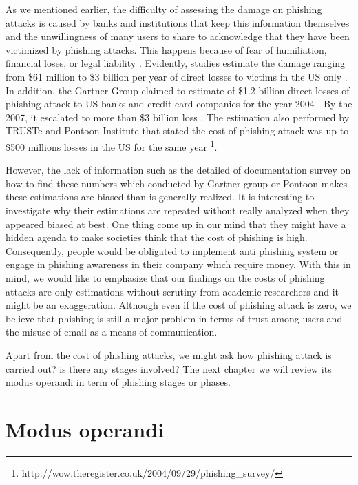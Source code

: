 As we mentioned earlier, the difficulty of assessing the damage on
phishing attacks is caused by banks and institutions that keep this
information themselves and the unwillingness of many users to share
to acknowledge that they have been victimized by phishing attacks.
This happens because of fear of humiliation, financial loses, or legal
liability \citep{jakobsson:2006}. Evidently, studies estimate the
damage ranging from \$61 million \citep{herley:2009} to \$3 billion
per year \citep{mccall2007gartner} of direct losses to victims in
the US only \citep{hong:2012}\citep{moura2009scalable}. In addition,
the Gartner Group claimed to estimate of \$1.2 billion direct losses
of phishing attack to US banks and credit card companies for the year
2004 \citep{litan2004phishing}. By the 2007, it escalated to more
than \$3 billion loss \citep{mccall:2007}. The estimation also performed
by TRUSTe and Pontoon Institute that stated the cost of phishing attack
was up to \$500 millions losses in the US for the same year %
\footnote{http://wow.theregister.co.uk/2004/09/29/phishing\_survey/%
}.

However, the lack of information such as the detailed of documentation
survey on how to find these numbers which conducted by Gartner group
or Pontoon makes these estimations are biased than is generally realized.
It is interesting to investigate why their estimations are repeated
without really analyzed when they appeared biased at best. One thing
come up in our mind that they might have a hidden agenda to make societies
think that the cost of phishing is high. Consequently, people would
be obligated to implement anti phishing system or engage in phishing
awareness in their company which require money. With this in mind,
we would like to emphasize that our findings on the costs of phishing
attacks are only estimations without scrutiny from academic researchers
and it might be an exaggeration. Although even if the cost of phishing
attack is zero, we believe that phishing is still a major problem
in terms of trust among users and the misuse of email as a means of
communication.

Apart from the cost of phishing attacks, we might ask how phishing
attack is carried out? is there any stages involved? The next chapter
we will review its modus operandi in term of phishing stages or phases.


\section{Modus operandi}

